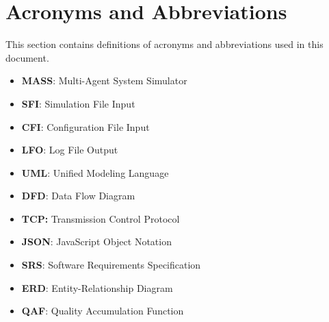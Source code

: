 \section{Acronyms and Abbreviations}

This section contains definitions of acronyms and abbreviations used in this document.

\begin{itemize}
\item{\textbf{MASS}: Multi-Agent System Simulator}
\item{\textbf{SFI}: Simulation File Input}
\item{\textbf{CFI}: Configuration File Input}
\item{\textbf{LFO}: Log File Output}

\item{\textbf{UML}: Unified Modeling Language}
\item{\textbf{DFD}: Data Flow Diagram}
\item{\textbf{TCP:} Transmission Control Protocol}
\item{\textbf{JSON}: JavaScript Object Notation}
\item{\textbf{SRS}: Software Requirements Specification}
\item{\textbf{ERD}: Entity-Relationship Diagram}
\item{\textbf{QAF}: Quality Accumulation Function}
\end{itemize}


